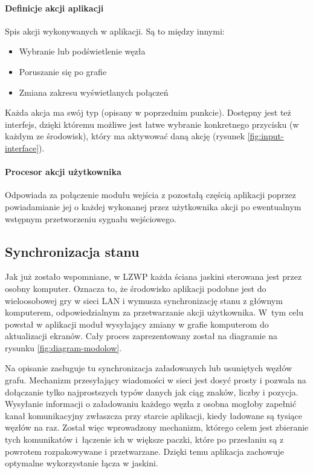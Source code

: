 \paragraph{Definicje akcji aplikacji}
Spis akcji wykonywanych w aplikacji. Są to między innymi: 
\begin{itemize}
	\item Wybranie lub podświetlenie węzła
	\item Poruszanie się po grafie
	\item Zmiana zakresu wyświetlanych połączeń
\end{itemize}
Każda akcja ma swój typ (opisany w poprzednim punkcie). Dostępny jest też interfejs, dzięki któremu możliwe jest łatwe wybranie konkretnego przycisku (w każdym ze środowisk), który ma aktywować daną akcję (rysunek \ref{fig:input-interface}).

\paragraph{Procesor akcji użytkownika}
Odpowiada za połączenie modułu wejścia z pozostałą częścią aplikacji poprzez powiadamianie jej o każdej wykonanej przez użytkownika akcji po ewentualnym wstępnym przetworzeniu sygnału wejściowego.



\subsection{Synchronizacja stanu}
Jak już zostało wspomniane, w LZWP każda ściana jaskini sterowana jest przez osobny komputer. Oznacza to, że środowisko aplikacji podobne jest do wieloosobowej gry w sieci LAN i wymusza synchronizację stanu z głównym komputerem, odpowiedzialnym za przetwarzanie akcji użytkownika. W~tym celu powstał w aplikacji moduł wysyłający zmiany w grafie komputerom do aktualizacji ekranów. Cały proces zaprezentowany został na diagramie na rysunku \ref{fig:diagram-modolow}.

Na opisanie zasługuje tu synchronizacja załadowanych lub usuniętych węzłów grafu. Mechanizm przesyłający wiadomości w sieci jest dosyć prosty i pozwala na dołączanie tylko najprostszych typów danych jak ciąg znaków, liczby i pozycja. Wysyłanie informacji o załadowaniu każdego węzła z osobna mogłoby zapełnić kanał komunikacyjny zwłaszcza przy starcie aplikacji, kiedy ładowane są tysiące węzłów na raz. Został więc wprowadzony mechanizm, którego celem jest zbieranie tych komunikatów i~łączenie ich w większe paczki, które po przesłaniu są z powrotem rozpakowywane i przetwarzane. Dzięki temu aplikacja zachowuje optymalne wykorzystanie łącza w jaskini.


